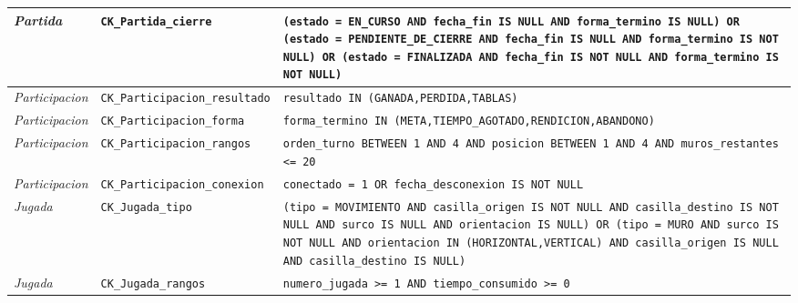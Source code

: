 \begin{center}
\begin{longtable}{|L{0.19\textwidth}|L{0.23\textwidth}|L{0.48\textwidth}|}
\textit{Partida} & \texttt{CK\_\allowbreak{}Partida\_\allowbreak{}cierre} & \texttt{(estado = \textquotesingle{}EN\_\allowbreak{}CURSO\textquotesingle{} AND fecha\_\allowbreak{}fin IS NULL AND forma\_\allowbreak{}termino IS NULL) OR (estado = \textquotesingle{}PENDIENTE\_\allowbreak{}DE\_\allowbreak{}CIERRE\textquotesingle{} AND fecha\_\allowbreak{}fin IS NULL AND forma\_\allowbreak{}termino IS NOT NULL) OR (estado = \textquotesingle{}FINALIZADA\textquotesingle{} AND fecha\_\allowbreak{}fin IS NOT NULL AND forma\_\allowbreak{}termino IS NOT NULL)} \\ \hline
\textit{Participacion} & \texttt{CK\_\allowbreak{}Participacion\_\allowbreak{}resultado} & \texttt{resultado IN (\textquotesingle{}GANADA\textquotesingle{},\allowbreak{}\textquotesingle{}PERDIDA\textquotesingle{},\allowbreak{}\textquotesingle{}TABLAS\textquotesingle{})} \\ \hline
\textit{Participacion} & \texttt{CK\_\allowbreak{}Participacion\_\allowbreak{}forma} & \texttt{forma\_\allowbreak{}termino IN (\textquotesingle{}META\textquotesingle{},\allowbreak{}\textquotesingle{}TIEMPO\_\allowbreak{}AGOTADO\textquotesingle{},\allowbreak{}\textquotesingle{}RENDICION\textquotesingle{},\allowbreak{}\textquotesingle{}ABANDONO\textquotesingle{})} \\ \hline
\textit{Participacion} & \texttt{CK\_\allowbreak{}Participacion\_\allowbreak{}rangos} & \texttt{orden\_\allowbreak{}turno BETWEEN 1 AND 4 AND posicion BETWEEN 1 AND 4 AND muros\_\allowbreak{}restantes <= 20} \\ \hline
\textit{Participacion} & \texttt{CK\_\allowbreak{}Participacion\_\allowbreak{}conexion} & \texttt{conectado = 1 OR fecha\_\allowbreak{}desconexion IS NOT NULL} \\ \hline
\textit{Jugada} & \texttt{CK\_\allowbreak{}Jugada\_\allowbreak{}tipo} & \texttt{(tipo = \textquotesingle{}MOVIMIENTO\textquotesingle{} AND casilla\_\allowbreak{}origen IS NOT NULL AND casilla\_\allowbreak{}destino IS NOT NULL AND surco IS NULL AND orientacion IS NULL) OR (tipo = \textquotesingle{}MURO\textquotesingle{} AND surco IS NOT NULL AND orientacion IN (\textquotesingle{}HORIZONTAL\textquotesingle{},\allowbreak{}\textquotesingle{}VERTICAL\textquotesingle{}) AND casilla\_\allowbreak{}origen IS NULL AND casilla\_\allowbreak{}destino IS NULL)} \\ \hline
\textit{Jugada} & \texttt{CK\_\allowbreak{}Jugada\_\allowbreak{}rangos} & \texttt{numero\_\allowbreak{}jugada >= 1 AND tiempo\_\allowbreak{}consumido >= 0} \\ \hline

\end{longtable}
\end{center}
